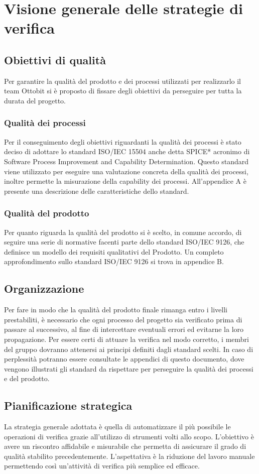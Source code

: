 \section{Visione generale delle strategie di verifica}
\subsection{Obiettivi di qualità}
	Per garantire la qualità del prodotto e dei processi utilizzati per realizzarlo il team Ottobit si è proposto di fissare degli obiettivi da perseguire per tutta la durata del progetto.
	\subsubsection{Qualità dei processi}
	Per il conseguimento degli obiettivi riguardanti la qualità dei processi è stato deciso di adottare lo standard ISO/IEC 15504 anche detta SPICE* acronimo di Software Process Improvement and Capability Determination. Questo standard viene utilizzato per eseguire una valutazione concreta della qualità dei processi, inoltre permette la misurazione della capability dei processi. All'appendice A è presente una descrizione delle caratteristiche dello standard.
	\subsubsection{Qualità del prodotto}
		Per quanto riguarda la qualità del prodotto si è scelto, in comune accordo, di seguire una serie di normative facenti parte dello standard ISO/IEC 9126, che definisce un modello dei requisiti qualitativi del Prodotto. Un completo approfondimento sullo standard ISO/IEC 9126 si trova in appendice B.
\subsection{Organizzazione}
Per fare in modo che la qualità del prodotto finale rimanga entro i livelli prestabiliti, è necessario che ogni processo del progetto sia verificato prima di passare al successivo, al fine di intercettare eventuali errori ed evitarne la loro propagazione. Per essere certi di attuare la verifica nel modo corretto, i membri del gruppo dovranno attenersi ai principi definiti dagli standard scelti. In caso di perplessità potranno essere consultate le appendici di questo documento, dove vengono illustrati gli standard da rispettare per perseguire la qualità dei processi e del prodotto.

\subsection{Pianificazione strategica}
La strategia generale adottata è quella di automatizzare il più possibile le operazioni di verifica grazie all'utilizzo di strumenti volti allo scopo. L'obiettivo è avere un riscontro affidabile e misurabile che permetta di assicurare il grado di qualità stabilito precedentemente.  L'aspettativa è la riduzione del lavoro manuale permettendo così un'attività di verifica più semplice ed efficace.

